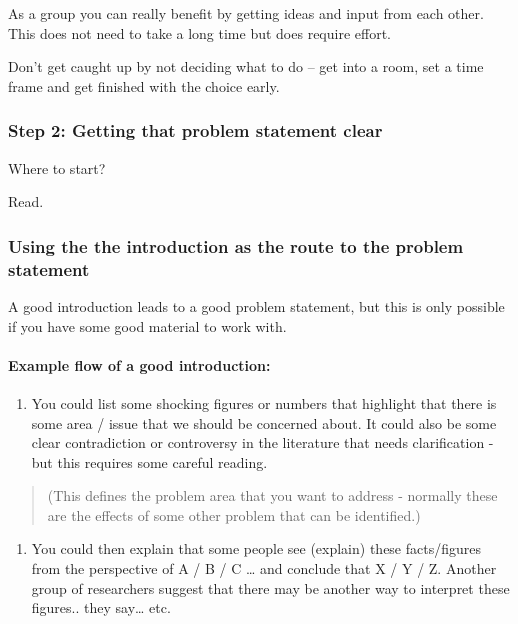 \documentclass[10pt,twoside]{article}
\providecommand{\tightlist}{%
  \setlength{\itemsep}{0pt}\setlength{\parskip}{0pt}}
\let\oldparagraph\paragraph
\renewcommand{\paragraph}[1]{\oldparagraph{#1}\mbox{}}
\begin{document}
As a group you can really benefit by getting ideas and input from each
other. This does not need to take a long time but does require effort.

Don't get caught up by not deciding what to do -- get into a room, set a
time frame and get finished with the choice early.

\hypertarget{step-2-getting-that-problem-statement-clear}{%
\subsubsection{Step 2: Getting that problem statement
clear}\label{step-2-getting-that-problem-statement-clear}}

Where to start?

Read.

\hypertarget{using-the-the-introduction-as-the-route-to-the-problem-statement}{%
\subsubsection{Using the the introduction as the route to the problem
statement}\label{using-the-the-introduction-as-the-route-to-the-problem-statement}}

A good introduction leads to a good problem statement, but this is only
possible if you have some good material to work with.

\hypertarget{example-flow-of-a-good-introduction}{%
\paragraph{Example flow of a good
introduction:}\label{example-flow-of-a-good-introduction}}

\begin{enumerate}
\def\labelenumi{\arabic{enumi}.}
\tightlist
\item
  You could list some shocking figures or numbers that highlight that
  there is some area / issue that we should be concerned about. It could
  also be some clear contradiction or controversy in the literature that
  needs clarification - but this requires some careful reading.
\end{enumerate}

\begin{quote}
(This defines the problem area that you want to address - normally these
are the effects of some other problem that can be identified.)
\end{quote}

\begin{enumerate}
\def\labelenumi{\arabic{enumi}.}
\setcounter{enumi}{1}
\tightlist
\item
  You could then explain that some people see (explain) these
  facts/figures from the perspective of A / B / C \ldots{} and conclude
  that X / Y / Z. Another group of researchers suggest that there may be
  another way to interpret these figures.. they say\ldots{} etc.
\end{enumerate}
\end{document}
